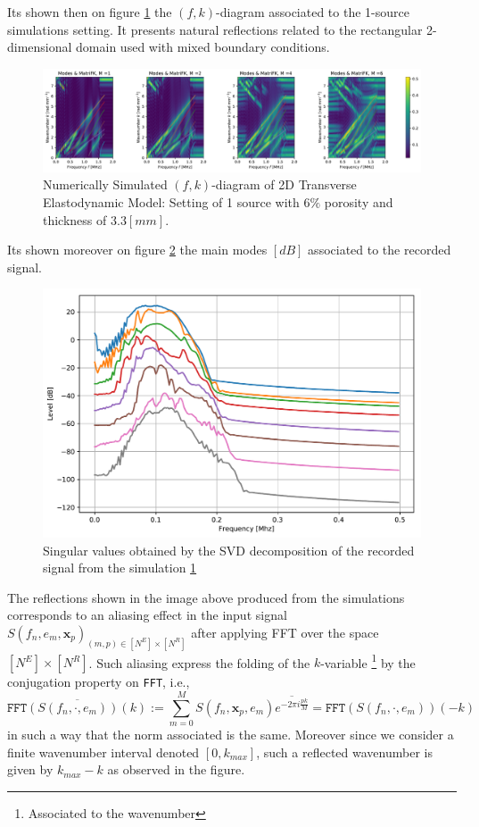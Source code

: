 Its shown then on figure \ref{FK-DiagramS1P6M33} the $(f,k)$-diagram associated to the 1-source simulations setting. It presents natural reflections related to the rectangular 2-dimensional domain used with mixed boundary conditions.
\begin{figure}[!h]
	\centering
	\includegraphics[width=\textwidth]{images/TimeSingSous/2DTime_P6ElasticFK33M1460_y.pdf}
	\caption{Numerically Simulated $(f,k)$-diagram of 2D Transverse Elastodynamic Model: Setting of 1 source with $6\%$ porosity and thickness of $3.3 [mm]$.}
	\label{FK-DiagramS1P6M33}
\end{figure}

Its shown moreover on figure \ref{SVD-S1P6M33} the main modes $[dB]$ associated to the recorded signal.
\begin{figure}[!h]
	\centering
	\includegraphics[scale=.5]{images/TimeSingSous/2DTime_P6Elastic33_SV.pdf}
	\caption{Singular values obtained by the SVD decomposition of the recorded signal from the simulation \ref{FK-DiagramS1P6M33}}
	\label{SVD-S1P6M33}
\end{figure}

The reflections shown in the image above produced from the simulations corresponds to an aliasing effect in the input signal $S(f_n, e_m, \mathbf{x}_p)_{(m,p) \in [N^E]\times [N^R]}$ after applying FFT over the space $[N^E] \times [N^R]$. Such aliasing express the folding of the $k$-variable \footnote{Associated to the wavenumber} by the conjugation property on \texttt{FFT}, i.e., 
\begin{equation*}
    \overline{\texttt{FFT}(S(f_n, \cdot, e_m))(k)} := \sum_{m=0}^M S(f_n, \mathbf{x}_p, e_m) \overline{e^{-2 \pi i \frac{p k}{M}}} = \texttt{FFT}(S(f_n, \cdot, e_m))(-k)
\end{equation*}
in such a way that the norm associated is the same. Moreover since we consider a finite wavenumber interval denoted $[0, k_{max}]$, such a reflected wavenumber is given by $k_{max}-k$ as observed in the figure.

